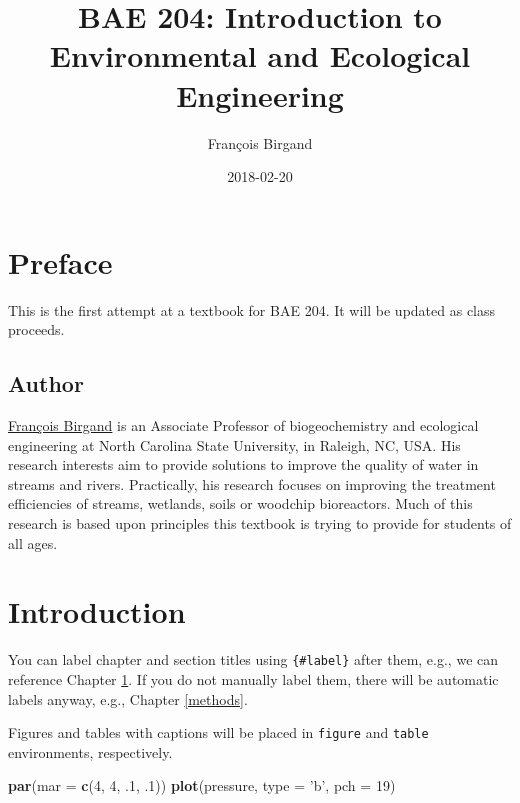 \documentclass[]{book}
\title{BAE 204: Introduction to Environmental and Ecological Engineering}
\author{François Birgand}
\date{2018-02-20}
\newenvironment{Shaded}{\begin{snugshade}}{\end{snugshade}}
\newcommand{\KeywordTok}[1]{\textcolor[rgb]{0.13,0.29,0.53}{\textbf{#1}}}
\newcommand{\DataTypeTok}[1]{\textcolor[rgb]{0.13,0.29,0.53}{#1}}
\newcommand{\DecValTok}[1]{\textcolor[rgb]{0.00,0.00,0.81}{#1}}
\newcommand{\StringTok}[1]{\textcolor[rgb]{0.31,0.60,0.02}{#1}}
\newcommand{\NormalTok}[1]{#1}
\theoremstyle{definition}
\theoremstyle{definition}
\theoremstyle{definition}
\theoremstyle{remark}
\begin{document}
\maketitle

{
\setcounter{tocdepth}{1}
\tableofcontents
}
\chapter*{Preface}\label{preface}

This is the first attempt at a textbook for BAE 204. It will be updated
as class proceeds.

\section*{Author}\label{author}

\href{https://francoisbirgand.github.io}{François Birgand} is an
Associate Professor of biogeochemistry and ecological engineering at
North Carolina State University, in Raleigh, NC, USA. His research
interests aim to provide solutions to improve the quality of water in
streams and rivers. Practically, his research focuses on improving the
treatment efficiencies of streams, wetlands, soils or woodchip
bioreactors. Much of this research is based upon principles this
textbook is trying to provide for students of all ages.

\chapter{Introduction}\label{intro}

You can label chapter and section titles using \texttt{\{\#label\}}
after them, e.g., we can reference Chapter \ref{intro}. If you do not
manually label them, there will be automatic labels anyway, e.g.,
Chapter \ref{methods}.

Figures and tables with captions will be placed in \texttt{figure} and
\texttt{table} environments, respectively.

\begin{Shaded}
\begin{Highlighting}[]
\KeywordTok{par}\NormalTok{(}\DataTypeTok{mar =} \KeywordTok{c}\NormalTok{(}\DecValTok{4}\NormalTok{, }\DecValTok{4}\NormalTok{, .}\DecValTok{1}\NormalTok{, .}\DecValTok{1}\NormalTok{))}
\KeywordTok{plot}\NormalTok{(pressure, }\DataTypeTok{type =} \StringTok{'b'}\NormalTok{, }\DataTypeTok{pch =} \DecValTok{19}\NormalTok{)}
\end{Highlighting}
\end{Shaded}
\end{document}
